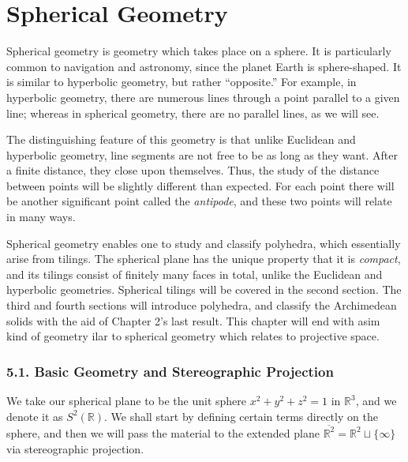 \documentclass[leqno]{book}
\begin{document}
\chapter{Spherical Geometry}

Spherical geometry is geometry which takes place on a sphere.  It is particularly common to navigation and astronomy, since the planet Earth is sphere-shaped.  It is similar to hyperbolic geometry, but rather ``opposite.''  For example, in hyperbolic geometry, there are numerous lines through a point parallel to a given line; whereas in spherical geometry, there are no parallel lines, as we will see.

The distinguishing feature of this geometry is that unlike Euclidean and hyperbolic geometry, line segments are not free to be as long as they want.  After a finite distance, they close upon themselves.  Thus, the study of the distance between points will be slightly different than expected.  For each point there will be another significant point called the \emph{antipode}, and these two points will relate in many ways.

Spherical geometry enables one to study and classify polyhedra, which essentially arise from tilings.  The spherical plane has the unique property that it is \emph{compact}, and its tilings consist of finitely many faces in total, unlike the Euclidean and hyperbolic geometries.  Spherical tilings will be covered in the second section.  The third and fourth sections will introduce polyhedra, and classify the Archimedean solids with the aid of Chapter 2's last result.  This chapter will end with asim kind of geometry ilar to spherical geometry which relates to projective space.

\subsection*{5.1. Basic Geometry and Stereographic Projection}
We take our spherical plane to be the unit sphere $x^2+y^2+z^2=1$ in $\mathbb R^3$, and we denote it as $S^2(\mathbb R)$.  We shall start by defining certain terms directly on the sphere, and then we will pass the material to the extended plane $\overline{\mathbb R^2}=\mathbb R^2\sqcup\{\infty\}$ via stereographic projection.
\end{document}
